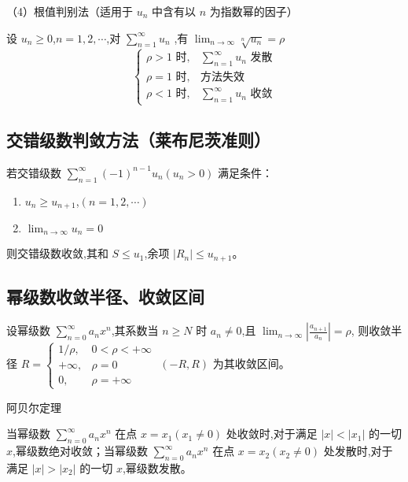 \documentclass[UTF8]{ctexart}
\theoremstyle{remark}
\begin{document}
		（4）根值判别法（适用于 \(u_n\) 中含有以 \(n\) 为指数幂的因子）
		
		设 \(u_n\geq0\),\(n = 1, 2, \cdots\),对 \(\sum_{n = 1}^{\infty} u_n\) ,有 \(\lim_{n \to \infty} \sqrt[n]{u_n}=\rho\)
		\[
		\begin{cases}
			\rho>1\text{ 时}, & \sum_{n = 1}^{\infty} u_n\text{ 发散}\\
			\rho = 1\text{ 时}, & \text{方法失效}\\
			\rho<1\text{ 时}, & \sum_{n = 1}^{\infty} u_n\text{ 收敛}
		\end{cases}
		\]
		
		\subsection{交错级数判敛方法（莱布尼茨准则）}
		若交错级数 \(\sum_{n = 1}^{\infty} (-1)^{n - 1}u_n (u_n>0)\) 满足条件：
		\begin{enumerate}
			\item \(u_n\geq u_{n + 1}\),\((n = 1, 2, \cdots)\)
			\item \(\lim_{n \to \infty} u_n = 0\)
		\end{enumerate}
		则交错级数收敛,其和 \(S\leq u_1\),余项 \(|R_n|\leq u_{n + 1}\)。
		
		\subsection{幂级数收敛半径、收敛区间}
		设幂级数 \(\sum_{n = 0}^{\infty} a_nx^n\),其系数当 \(n\geq N\) 时 \(a_n\neq0\),且 \(\lim_{n \to \infty} \left|\frac{a_{n + 1}}{a_n}\right|=\rho\),
		则收敛半径 \(R = 
		\begin{cases}
			1/\rho, & 0 < \rho < +\infty\\
			+\infty, & \rho = 0\\
			0, & \rho = +\infty
		\end{cases}\)
		\((-R, R)\) 为其收敛区间。
		
		阿贝尔定理
		
		当幂级数 \(\sum_{n = 0}^{\infty} a_nx^n\) 在点 \(x = x_1 (x_1\neq0)\) 处收敛时,对于满足 \(|x| < |x_1|\) 的一切 \(x\),幂级数绝对收敛；当幂级数 \(\sum_{n = 0}^{\infty} a_nx^n\) 在点 \(x = x_2 (x_2\neq0)\) 处发散时,对于满足 \(|x| > |x_2|\) 的一切 \(x\),幂级数发散。
		
\end{document}
